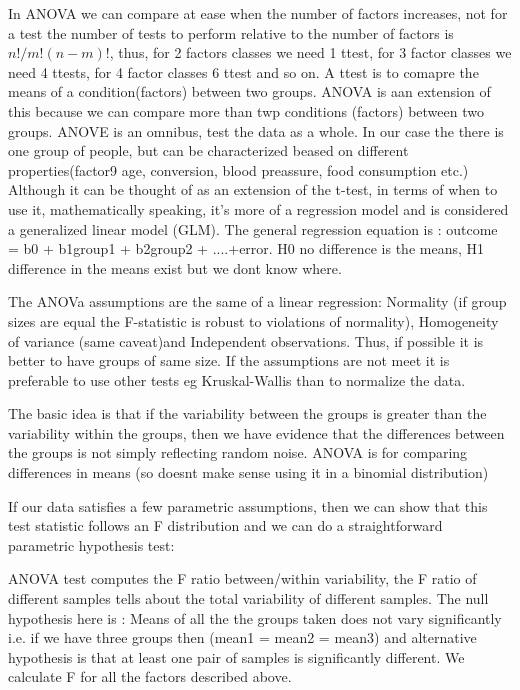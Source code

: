 \documentclass[11pt]{article}
\theoremstyle{definition}
\theoremstyle{remark}
\begin{document}
In ANOVA we can compare at ease when the number of factors increases, not for a test the number of tests to perform relative to the number of factors is $n!/m!(n-m)!$, thus, for 2 factors classes we need 1 ttest, for 3 factor classes we need 4 ttests, for 4 factor classes 6 ttest and so on.
A ttest is to comapre the means of a condition(factors) between two groups. ANOVA is aan extension of this because we can compare more than twp conditions (factors) between two groups. ANOVE is an omnibus, test the data as a whole.
In our case the there is one group of people, but can be characterized beased on different properties(factor9 age, conversion, blood preassure, food consumption etc.)
Although it can be thought of as an extension of the t-test, in terms of when to use it, mathematically speaking, it’s more of a regression model and is considered a generalized linear model (GLM). The general regression equation is : outcome = b0 + b1group1 + b2group2 + ....+error.
H0 no difference is the means, H1 difference in the means exist but we dont know where.

The ANOVa assumptions are the same of a linear regression: Normality (if group sizes are equal the F-statistic is robust to violations of normality), Homogeneity of variance (same caveat)and Independent observations. Thus, if possible it is better to have groups of same size. If the assumptions are not meet it is preferable to use other tests eg Kruskal-Wallis than to normalize the data.

The basic idea is that if the variability between the groups is greater than the variability within the groups, then we have evidence that the differences between the groups is not simply reflecting random noise.
ANOVA is for comparing differences in means (so doesnt make sense using it in a binomial distribution)

If our data satisfies a few parametric assumptions, then we can show that this test statistic follows an F distribution and we can do a straightforward parametric hypothesis test:

ANOVA test computes the F ratio between/within variability, the F ratio of different samples tells about the total variability of different samples.
The null hypothesis here is : Means of all the the groups taken does not vary significantly i.e. if we have three groups then (mean1 = mean2 = mean3) and alternative hypothesis is that at least one pair of samples is significantly different.
We calculate F for all the factors described above.
\end{document}
